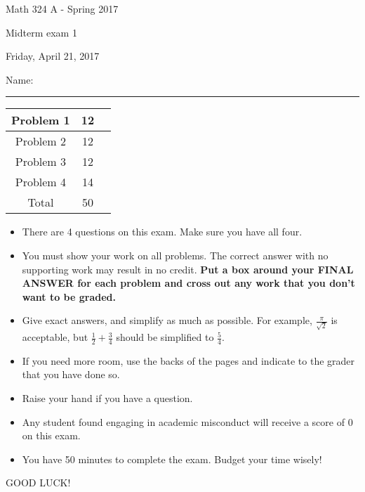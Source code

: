 \documentclass[12 pt]{report}
\begin{document}
\noindent \vfill \noindent \large

\centerline{Math 324 A  - Spring 2017}

\centerline{Midterm exam 1}

\centerline{Friday, April 21, 2017}

\normalsize

\vfill
\medskip
Name: \rule{10cm}{1pt}

\bigskip

\vfill
\begin{center}
{\large
\begin{tabular}{||c|c|r||}
\hline Problem 1 & 12 & \hspace{10mm} \hfill \\
\hline Problem 2 & 12  & \hspace{10mm} \hfill \\
\hline Problem 3 & 12 & \hspace{10mm} \hfill \\
\hline Problem 4 & 14  & \hspace{10mm} \hfill \\
\hline Total & 50 & \hspace{10mm} \hfill \\
\hline
\end{tabular}
}
\end{center}
\vfill
\begin{itemize}
\item There are 4 questions on this exam. Make sure you have all four.
\item You must show your work on all problems.  The correct answer
with no supporting work may result in no credit. \textbf{Put a box
around your FINAL ANSWER for each problem and cross out any work
that you don't want to be graded.} 
\item Give exact answers, and simplify as much as possible. 
For example, $\frac{\pi}{\sqrt{2}}$ is acceptable, but $\frac{1}{2} + \frac{3}{4}$
should be simplified to $\frac{5}{4}$.  

\item If you need more room, use the backs
of the pages and indicate to the grader that you have done so.
\item Raise your hand if you have a question.
\item Any student found engaging in academic misconduct will receive
a score of 0 on this exam.
\item You have 50 minutes to complete the exam.  Budget your time wisely! \\
\end{itemize}
\vfill
\begin{center}GOOD LUCK!\end{center}
\end{document}
